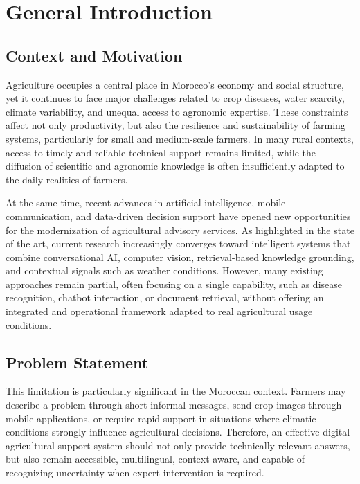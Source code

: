 \chapter*{General Introduction}

\section{Context and Motivation}

Agriculture occupies a central place in Morocco's economy and social structure, yet it continues to face major challenges related to crop diseases, water scarcity, climate variability, and unequal access to agronomic expertise. These constraints affect not only productivity, but also the resilience and sustainability of farming systems, particularly for small and medium-scale farmers. In many rural contexts, access to timely and reliable technical support remains limited, while the diffusion of scientific and agronomic knowledge is often insufficiently adapted to the daily realities of farmers.

At the same time, recent advances in artificial intelligence, mobile communication, and data-driven decision support have opened new opportunities for the modernization of agricultural advisory services. As highlighted in the state of the art, current research increasingly converges toward intelligent systems that combine conversational AI, computer vision, retrieval-based knowledge grounding, and contextual signals such as weather conditions. However, many existing approaches remain partial, often focusing on a single capability, such as disease recognition, chatbot interaction, or document retrieval, without offering an integrated and operational framework adapted to real agricultural usage conditions.

\section{Problem Statement}

This limitation is particularly significant in the Moroccan context. Farmers may describe a problem through short informal messages, send crop images through mobile applications, or require rapid support in situations where climatic conditions strongly influence agricultural decisions. Therefore, an effective digital agricultural support system should not only provide technically relevant answers, but also remain accessible, multilingual, context-aware, and capable of recognizing uncertainty when expert intervention is required.

